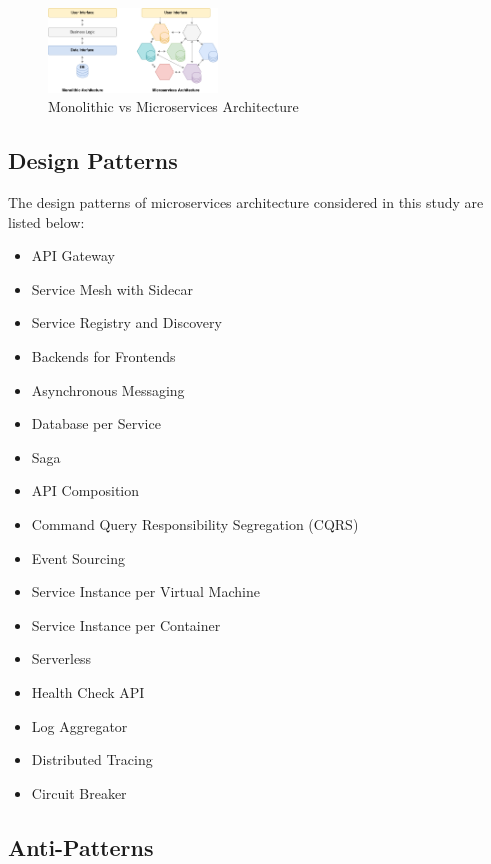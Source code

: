 \documentclass[11pt,a4paper,twocolumn]{article}
\begin{document}
\begin{figure}[H]
\centering
\includegraphics[width=0.40\textwidth]{monovsmicro.png}
\caption{Monolithic vs Microservices Architecture}
\label{fig:monovsmicro}
\end{figure}

\subsection{Design Patterns}
\label{subsec:patterns}

The design patterns of microservices architecture considered in this study are listed below:

\begin{itemize}
    \item API Gateway
    \item Service Mesh with Sidecar
    \item Service Registry and Discovery
    \item Backends for Frontends
    \item Asynchronous Messaging
    \item Database per Service
    \item Saga
    \item API Composition
    \item Command Query Responsibility Segregation (CQRS)
    \item Event Sourcing
    \item Service Instance per Virtual Machine
    \item Service Instance per Container
    \item Serverless
    \item Health Check API
    \item Log Aggregator
    \item Distributed Tracing
    \item Circuit Breaker
\end{itemize}

\subsection{Anti-Patterns}
\label{subsec:anti-patterns}
\end{document}

